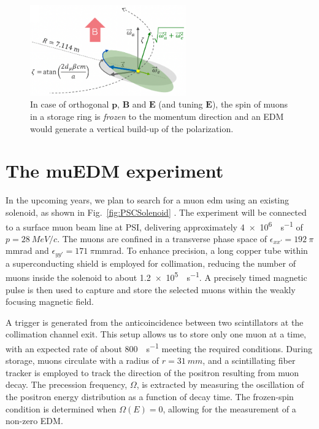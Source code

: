 \begin{refsection}
        \begin{figure}
            \centering
            \includegraphics[width = 0.6\textwidth]{Figures/muEDM/g-2_EDM.png}
            \caption[muEDM: frozen spin technique]{In case of orthogonal $\bm{p}$, $\bm{B}$ and $\bm{E}$ (and tuning $\bm{E}$), the spin of muons in a storage ring is \textit{frozen} to the momentum direction and an EDM would generate a vertical build-up of the polarization.}
            \label{fig:muEDM:g-2_EDM}
        \end{figure}

\section{The muEDM experiment}
    In the upcoming years, we plan to search for a muon \gls{edm} using an existing solenoid, as shown in Fig.~\ref{fig:PSCSolenoid} \cite{muEDM:PSI:Kim:2022} \cite{muEDM:PSI:Mikio:2022}. 
    The experiment will be connected to a surface muon beam line at PSI, delivering approximately \SI{4e6}{\upmu \per s} of $p=\SI{28}{MeV/c}$. 
    The muons are confined in a transverse phase space of $\epsilon_{xx'}= 192\ \pi$mmrad and $\epsilon_{yy'}= 171\ \pi$mmrad. 
    To enhance precision, a long copper tube within a superconducting shield is employed for collimation, reducing the number of muons inside the solenoid to about \SI{1.2e5}{\upmu \per s}. 
    A precisely timed magnetic pulse is then used to capture and store the selected muons within the weakly focusing magnetic field.
    
    \noindent
    A trigger is generated from the anticoincidence between two scintillators at the collimation channel exit. 
    This setup allows us to store only one muon at a time, with an expected rate of about \SI{800}{\upmu \per s} meeting the required conditions. 
    During storage, muons circulate with a radius of $r=\SI{31}{mm}$, and a scintillating fiber tracker is employed to track the direction of the positron resulting from muon decay. 
    The precession frequency, $\Omega$, is extracted by measuring the oscillation of the positron energy distribution as a function of decay time. 
    The frozen-spin condition is determined when $\Omega(E)=0$, allowing for the measurement of a non-zero EDM.


\end{refsection}
